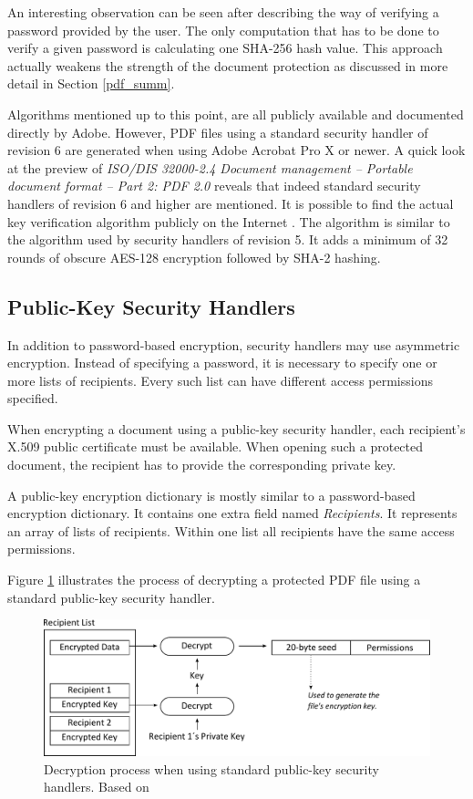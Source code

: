 \documentclass[11pt,oneside]{fithesis2}
\begin{document}
An interesting observation can be seen after describing the way of verifying a password provided by the user. The only computation that has to be done to verify a given password is calculating one SHA-256 hash value. This approach actually weakens the strength of the document protection as discussed in more detail in Section \ref{pdf_summ}.

Algorithms mentioned up to this point, are all publicly available and documented directly by Adobe. However, PDF files using a standard security handler of revision 6 are generated when using Adobe Acrobat Pro X or newer. A quick look at the preview of \textit{ISO/DIS 32000-2.4 Document management -- Portable document format -- Part 2: PDF 2.0} reveals that indeed standard security handlers of revision 6 and higher are mentioned. It is possible to find the actual key verification algorithm publicly on the Internet \cite{esec_lab}. The algorithm is similar to the algorithm used by security handlers of revision 5. It adds a minimum of 32 rounds of obscure AES-128 encryption followed by SHA-2 hashing.

\subsection{Public-Key Security Handlers}

In addition to password-based encryption, security handlers may use asymmetric encryption. Instead of specifying a password, it is necessary to specify one or more  lists of recipients. Every such list can have different access permissions specified. 

When encrypting a document using a public-key security handler, each recipient's X.509 public certificate must be available. When opening such a protected document, the recipient has to provide the corresponding private key.

A public-key encryption dictionary is mostly similar to a password-based encryption dictionary. It contains one extra field named \textit{Recipients}. It represents an array of lists of recipients. Within one list all recipients have the same access permissions. 

Figure \ref{public_key_alg} illustrates the process of decrypting a protected PDF file using a standard public-key security handler.

\begin{figure}[ht]
	\centering
	\includegraphics[width=1\textwidth]{figures/public_key_alg.pdf}
	\caption{Decryption process when using standard public-key security handlers. Based on \cite[p. 130]{pdf_spec}}
	\label{public_key_alg}
\end{figure}
\end{document}
